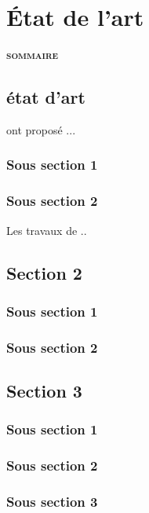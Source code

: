\chapter{État de l’art}

\vspace{20pt}
\begin{center} {\scshape\bfseries sommaire} \end{center}
\startcontents[chapters]

\smash{\rule{\textwidth}{.4pt}}
\smash{\rule{\textwidth}{.4pt}}

\vspace{20pt}



\section{état d'art}

\cite{benhaddi2012user,el2010design} ont proposé ...

\subsection{Sous section 1}
\subsection{Sous section 2}

Les travaux de \cite{wermers2000mutual} ..

\section{Section 2}

\subsection{Sous section 1}
\subsection{Sous section 2}

\section{Section 3}

\subsection{Sous section 1}
\subsection{Sous section 2}
\subsection{Sous section 3}
